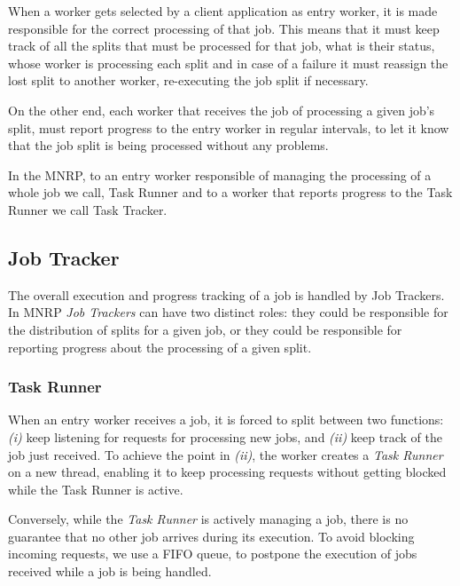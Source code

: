 \documentclass[times, 10pt,twocolumn]{article}
\begin{document}
        When a worker gets selected by a client application as entry worker, it is made responsible for the correct processing of that job. This means that it must keep track of all the splits that must be processed for that job, what is their status, whose worker is processing each split and in case of a failure it must reassign the lost split to another worker, re-executing the job split if necessary.
        
        On the other end, each worker that receives the job of processing a given job's split, must report progress to the entry worker in regular intervals, to let it know that the job split is being processed without any problems.
        
        In the \ac{MNRP}, to an entry worker responsible of managing the processing of a whole job we call, Task Runner and to a worker that reports progress to the Task Runner we call Task Tracker.
       
    	\subsection{Job Tracker}
        
        The overall execution and progress tracking of a job is handled by Job Trackers. In \ac{MNRP} \emph{Job Trackers} can have two distinct roles: they could be responsible for the distribution of splits for a given job, or they could be responsible for reporting progress about the processing of a given split.        
               
            \subsubsection{Task Runner}
            
            When an entry worker receives a job, it is forced to split between two functions: {\it (i)} keep listening for requests for processing new jobs, and {\it (ii)} keep track of the job just received. To achieve the point in {\it (ii)}, the worker creates a \emph{Task Runner} on a new thread, enabling it to keep processing requests without getting blocked while the Task Runner is active.
            
            Conversely, while the \emph{Task Runner} is actively managing a job, there is no guarantee that no other job arrives during its execution. To avoid blocking incoming requests, we use a FIFO queue, to postpone the execution of jobs received while a job is being handled. 
            
\end{document}
